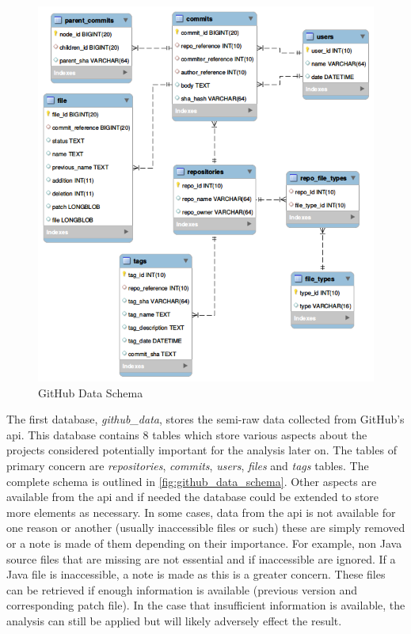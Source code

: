 \begin{figure}[!ht]
    \centering
        \includegraphics[width=1.0\textwidth]{images/github_data_schema}
    \caption{GitHub Data Schema}
    \label{fig:github_data_schema}
\end{figure}

The first database, \textit{github\_data}, stores the semi-raw data collected from GitHub's \gls{api}. This database contains 8 tables which store various aspects about the projects considered potentially important for the analysis later on. The tables of primary concern are \textit{repositories}, \textit{commits}, \textit{users}, \textit{files} and \textit{tags} tables. The complete schema is outlined in \autoref{fig:github_data_schema}. Other aspects are available from the \gls{api} and if needed the database could be extended to store more elements as necessary. In some cases, data from the \gls{api} is not available for one reason or another (usually inaccessible files or such) these are simply removed or a note is made of them depending on their importance. For example, non Java source files that are missing are not essential and if inaccessible are ignored. If a Java file is inaccessible, a note is made as this is a greater concern. These files can be retrieved if enough information is available (previous version and corresponding patch file). In the case that insufficient information is available, the analysis can still be applied but will likely adversely effect the result.

